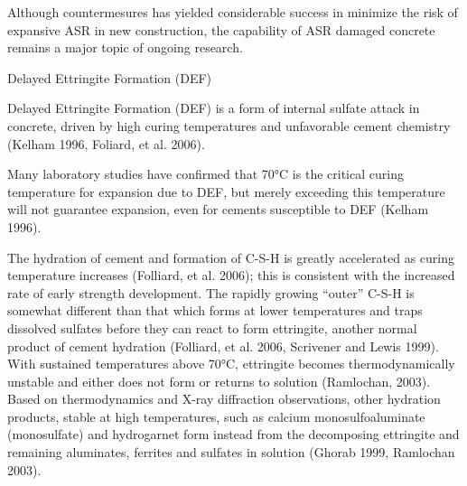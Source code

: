 
Although countermesures has yielded considerable success in minimize the risk of expansive ASR in new construction, the capability of ASR damaged concrete remains a major topic of ongoing research.


Delayed Ettringite Formation (DEF)

Delayed Ettringite Formation (DEF) is a form of internal sulfate attack in concrete, driven by high curing temperatures and unfavorable cement chemistry (Kelham 1996, Foliard, et al. 2006).

Many laboratory studies have confirmed that 70°C is the critical curing temperature for expansion due to DEF, but merely exceeding this temperature will not guarantee expansion, even for cements susceptible to DEF (Kelham 1996).

The hydration of cement and formation of C-S-H is greatly accelerated as curing temperature increases (Folliard, et al. 2006); this is consistent with the increased rate of early strength development. The rapidly growing “outer” C-S-H is somewhat different than that which forms at lower temperatures and traps dissolved sulfates before they can react to form ettringite, another normal product of cement hydration (Folliard, et al. 2006, Scrivener and Lewis 1999). With sustained temperatures above 70°C, ettringite becomes thermodynamically unstable and either does not form or returns to solution (Ramlochan, 2003). Based on thermodynamics and X-ray diffraction observations, other hydration products, stable at high temperatures, such as calcium monosulfoaluminate (monosulfate) and hydrogarnet form instead from the decomposing ettringite and remaining aluminates, ferrites and sulfates in solution (Ghorab 1999, Ramlochan 2003).
